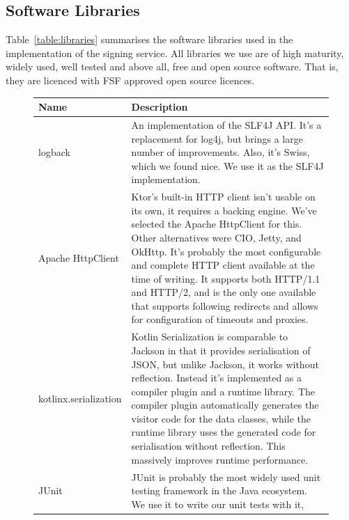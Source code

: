 \subsection{Software Libraries}\label{subsec:software-libraries}
Table~\ref{table:libraries} summarises the software libraries used in the implementation of the signing service.
All libraries we use are of high maturity, widely used, well tested and above all,
free and open source software.
That is, they are licenced with \gls{FSF} approved open source licences.

\begin{figure}
    \begin{center}
        \begin{tabular}{p{3cm}|p{12cm}}
            \textbf{Name} & \textbf{Description} \\ \hline
            logback &
            An implementation of the \gls{SLF4J} \gls{API}.
            It's a replacement for log4j, but brings a large number of improvements.
            Also, it's Swiss, which we found nice.
            We use it as the \gls{SLF4J} implementation.
            \\ \hline
            Apache HttpClient &
            Ktor's built-in \gls{HTTP} client isn't usable on its own,
            it requires a backing engine.
            We've selected the Apache HttpClient for this.
            Other alternatives were \gls{CIO}, Jetty, and OkHttp.
            It's probably the most configurable and complete \gls{HTTP} client available at the time of writing. It supports both \gls{HTTP}/1.1 and \gls{HTTP}/2,
            and is the only one available that supports following redirects and allows for configuration of timeouts and proxies.
            \\ \hline
            kotlinx.serialization &
            Kotlin Serialization is comparable to Jackson in that it provides serialisation of \gls{JSON},
            but unlike Jackson,
            it works without reflection.
            Instead it's implemented as a compiler plugin and a runtime library.
            The compiler plugin automatically generates the visitor code for the data classes,
            while the runtime library uses the generated code for serialisation without reflection.
            This massively improves runtime performance.
            \\ \hline
            JUnit &
            JUnit is probably the most widely used unit testing framework in the Java ecosystem.
            We use it to write our unit tests with it,

\end{tabular}
\end{center}
\end{figure}
